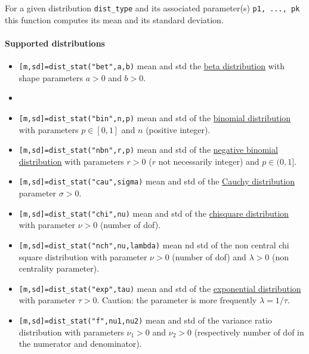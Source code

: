 \begin{mandescription}

For a given distribution \verb+dist_type+ and its associated parameter(s) \verb+p1, ..., pk+ this
function computes its mean and its standard deviation.

\paragraph{Supported distributions}
\begin{itemize}

\item {}  
\verb![m,sd]=dist_stat("bet",a,b)! mean and std the \hyperlink{betapdf}{beta distribution} with 
shape parameters $a > 0$ and $b > 0$.
 
\item {}
\item \verb![m,sd]=dist_stat("bin",n,p)! mean and std
  of the  \hyperlink{binpdf}{binomial distribution} with parameters $p \in [0,1]$ and $n$
  (positive integer). 

\item {} \verb![m,sd]=dist_stat("nbn",r,p)! mean and std 
of the \hyperlink{nbnpdf}{negative binomial distribution} with parameters $r > 0$ ($r$ not
  necessarily integer) and $p \in (0,1]$. 


\item {} \verb![m,sd]=dist_stat("cau",sigma)! mean and std of the  
\hyperlink{caupdf}{Cauchy distribution} parameter $\sigma > 0$.

\item {} \verb![m,sd]=dist_stat("chi",nu)! mean and std of the 
\hyperlink{chipdf}{chisquare distribution} with parameter $\nu > 0$ (number of dof).

\item {} \verb![m,sd]=dist_stat("nch",nu,lambda)! mean 
nd std of the non central chi square  distribution 
with parameter $\nu > 0$ (number of dof) and  $\lambda > 0$ (non centrality parameter).

\item {} \verb![m,sd]=dist_stat("exp",tau)! mean and std of the  
\hyperlink{exppdf}{exponential distribution} with parameter $\tau > 0$.
Caution: the parameter is more frequently $\lambda = 1/\tau$.

\item {} \verb![m,sd]=dist_stat("f",nu1,nu2)! mean and std 
of the variance ratio distribution with parameters $\nu_1 > 0$ and $\nu_2 > 0$ 
(respectively number of dof in the numerator and denominator). 


\end{itemize}
\end{mandescription}
